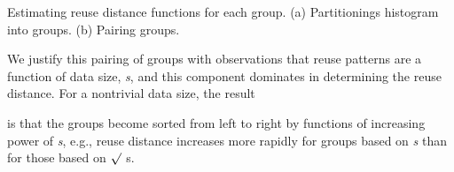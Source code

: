 \documentclass[12pt]{article}
\begin{document}
\vspace{\baselineskip}

\vspace{\baselineskip}

\vspace{\baselineskip}

\vspace{\baselineskip}

\vspace{\baselineskip}

\vspace{\baselineskip}

\vspace{\baselineskip}

\vspace{\baselineskip}

\vspace{\baselineskip}

\vspace{\baselineskip}

\vspace{\baselineskip}

\vspace{\baselineskip}
{\fontsize{9pt}{10.8pt}\selectfont \textcolor[HTML]{666666}{Estimating reuse distance functions for each group. (a) Partitionings histogram into groups. (b) Pairing groups.}\par}\par


\vspace{\baselineskip}

\vspace{\baselineskip}
\begin{adjustwidth}{0.0in}{0.07in}
{\fontsize{10pt}{12.0pt}\selectfont \textcolor[HTML]{333333}{We justify this pairing of groups with observations that reuse patterns are a function of data size, \textit{s}, and this component dominates in determining the reuse distance. For a nontrivial data size, the result}\par}\par

\end{adjustwidth}


\vspace{\baselineskip}
\begin{adjustwidth}{0.0in}{0.18in}
{\fontsize{11pt}{13.2pt}\selectfont \textcolor[HTML]{333333}{is that the groups become sorted from left to right by functions of increasing power of \textit{s}, e.g., reuse distance increases more rapidly for groups based on \textit{s} than for those based on $ \surd$ s.}\par}\par

\end{adjustwidth}
\end{document}
